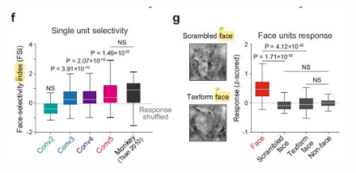 \documentclass[sn-mathphys]{sn-jnl}%
\theoremstyle{thmstyleone}%
\theoremstyle{thmstyletwo}%
\theoremstyle{thmstylethree}%
\begin{document}
\begin{figure}[htbp]
	\subfigure%
	{
		\begin{minipage}[t]{1.0\linewidth}
			\centering
			\includegraphics[width=1.0\textwidth]{figs/fig_1_f_g.pdf}
		\end{minipage}
	}
	

\end{figure}
\end{document}

